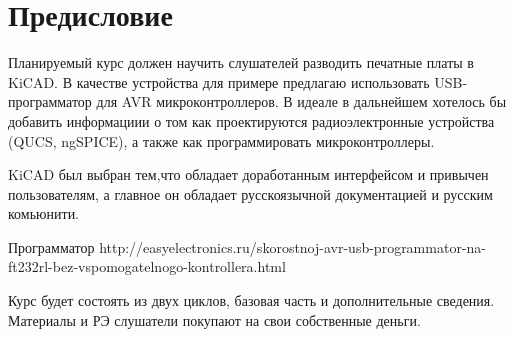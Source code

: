 \section{Предисловие}
Планируемый курс должен научить слушателей разводить печатные платы в KiCAD. В качестве устройства для примере предлагаю использовать USB-программатор для AVR микроконтроллеров. В идеале в дальнейшем хотелось бы добавить информациии о том как проектируются радиоэлектронные устройства (QUCS, ngSPICE), а также как программировать микроконтроллеры.

KiCAD был выбран тем,что обладает доработанным интерфейсом и привычен пользователям, а главное он обладает русскоязычной документацией и русским комьюнити.

Программатор http://easyelectronics.ru/skorostnoj-avr-usb-programmator-na-ft232rl-bez-vspomogatelnogo-kontrollera.html

Курс будет состоять из двух циклов, базовая часть и дополнительные сведения. Материалы и РЭ слушатели покупают на свои собственные деньги. 
